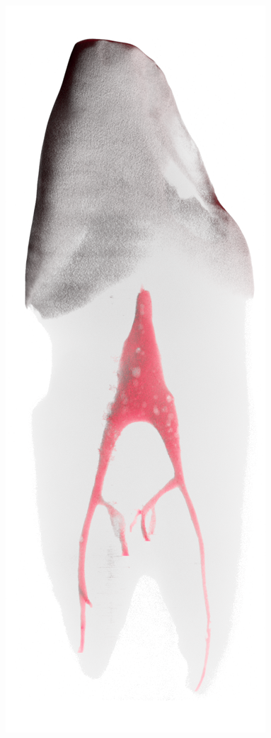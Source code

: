 \begin{frame}
\begin{frame}
		\includegraphics[height=\imageheight]{./images/rcs/Tooth0642}%

\end{frame}
\end{frame}
